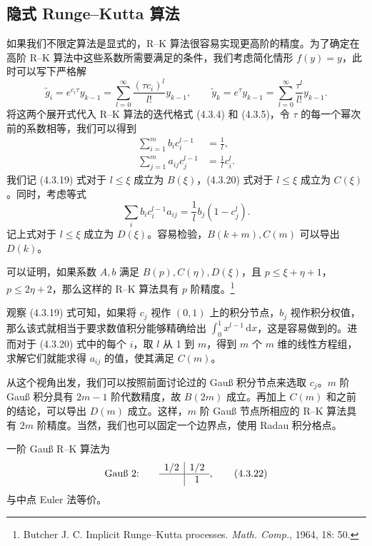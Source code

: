 \subsection{隐式 Runge--Kutta 算法}

如果我们不限定算法是显式的，R--K 算法很容易实现更高阶的精度。为了确定在高阶 R--K 算法中这些系数所需要满足的条件，我们考虑简化情形 $f(y)=y$，此时可以写下严格解
\begin{equation}
 \tilde g_i=e^{c_i\tau}y_{k-1}=\sum_{l=0}^{\infty}\frac{(\tau c_i)^l}{l!}y_{k-1},\qquad
 \tilde y_k=e^\tau y_{k-1}=\sum_{l=0}^{\infty}\frac{\tau^l}{l!}y_{k-1}.
\tag{4.3.18}
\end{equation}
将这两个展开式代入 R--K 算法的迭代格式 (4.3.4) 和 (4.3.5)，令 $\tau$ 的每一个幂次前的系数相等，我们可以得到
\begin{align}
 \sum_{i=1}^{m}b_i c_i^{l-1}&=\frac1l,\tag{4.3.19}\\
 \sum_{j=1}^{m}a_{ij}c_j^{l-1}&=\frac1l c_i^l.\tag{4.3.20}
\end{align}
我们记 (4.3.19) 式对于 $l\le\xi$ 成立为 $B(\xi)$，(4.3.20) 式对于 $l\le\xi$ 成立为 $C(\xi)$。同时，考虑等式
\begin{equation}
 \sum_i b_i c_i^{l-1}a_{ij}=\frac1l b_j(1-c_j^l).
\tag{4.3.21}
\end{equation}
记上式对于 $l\le\xi$ 成立为 $D(\xi)$。容易检验，$B(k+m),C(m)$ 可以导出 $D(k)$。

可以证明，如果系数 $A,b$ 满足 $B(p),C(\eta),D(\xi)$，且 $p\le\xi+\eta+1$，$p\le2\eta+2$，那么这样的 R--K 算法具有 $p$ 阶精度。\footnote{Butcher J. C. Implicit Runge--Kutta processes. \textit{Math. Comp.}, 1964, 18: 50.}

观察 (4.3.19) 式可知，如果将 $c_j$ 视作 $(0,1)$ 上的积分节点，$b_j$ 视作积分权值，那么该式就相当于要求数值积分能够精确给出 $\int_0^1x^{l-1}\,\mathrm dx$，这是容易做到的。进而对于 (4.3.20) 式中的每个 $i$，取 $l$ 从 1 到 $m$，得到 $m$ 个 $m$ 维的线性方程组，求解它们就能求得 $a_{ij}$ 的值，使其满足 $C(m)$。

从这个视角出发，我们可以按照前面讨论过的 Gauß 积分节点来选取 $c_j$。$m$ 阶 Gauß 积分具有 $2m-1$ 阶代数精度，故 $B(2m)$ 成立。再加上 $C(m)$ 和之前的结论，可以导出 $D(m)$ 成立。这样，$m$ 阶 Gauß 节点所相应的 R--K 算法具有 $2m$ 阶精度。当然，我们也可以固定一个边界点，使用 Radau 积分格点。

一阶 Gauß R--K 算法为
\begin{equation}
\text{Gauß 2:}\qquad
\begin{array}{c|c}
1/2&1/2\\ \hline
&1
\end{array},
\tag{4.3.22}
\end{equation}
与中点 Euler 法等价。

